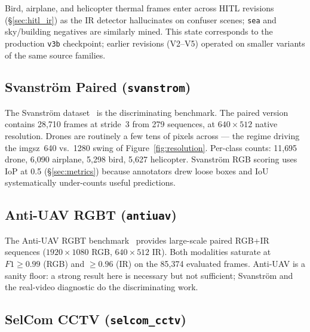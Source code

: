 Bird, airplane, and helicopter thermal frames enter across HITL revisions (\S\ref{sec:hitl_ir}) as the IR detector hallucinates on confuser scenes; \texttt{sea} and sky/building negatives are similarly mined. This state corresponds to the production \texttt{v3b} checkpoint; earlier revisions (V2--V5) operated on smaller variants of the same source families.

\subsection{Svanstr\"om Paired (\texttt{svanstrom})}
\label{sec:ds_svanstrom}

The Svanstr\"om dataset~\cite{svanstrom2021real,svanstrom2022dronedataset} is the discriminating benchmark. The paired version contains 28{,}710 frames at stride~3 from 279 sequences, at $640{\times}512$ native resolution. Drones are routinely a few tens of pixels across --- the regime driving the imgsz~640 vs.~1280 swing of Figure~\ref{fig:resolution}. Per-class counts: 11{,}695 drone, 6{,}090 airplane, 5{,}298 bird, 5{,}627 helicopter. Svanstr\"om RGB scoring uses IoP at 0.5 (\S\ref{sec:metrics}) because annotators drew loose boxes and IoU systematically under-counts useful predictions.

\subsection{Anti-UAV RGBT (\texttt{antiuav})}
\label{sec:ds_antiuav}

The Anti-UAV RGBT benchmark~\cite{jiang2021antiuav,zhao2023antiuav} provides large-scale paired RGB+IR sequences ($1920{\times}1080$ RGB, $640{\times}512$ IR). Both modalities saturate at $F1 \geq 0.99$ (RGB) and $\geq 0.96$ (IR) on the 85{,}374 evaluated frames. Anti-UAV is a sanity floor: a strong result here is necessary but not sufficient; Svanstr\"om and the real-video diagnostic do the discriminating work.

\subsection{SelCom CCTV (\texttt{selcom\_cctv})}
\label{sec:ds_selcom}

